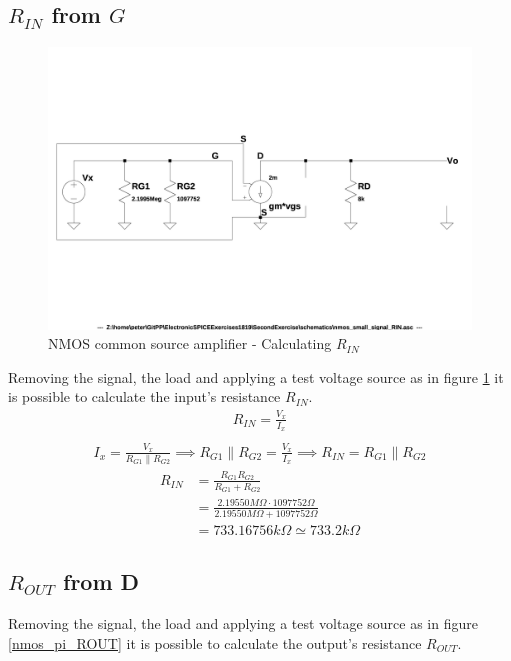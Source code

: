 \documentclass[10pt,a4paper]{book}
\begin{document}
\subsection{$R_{IN}$ from $G$}

\begin{figure}[h]
  \centering
  \includegraphics[width=12cm]{schematics/nmos_small_signal_RIN.jpg}
  \caption{NMOS common source amplifier - Calculating $R_{IN}$}
  \label{nmos_pi_RIN}
\end{figure}

Removing the signal, the load and applying a test voltage source as in figure \ref{nmos_pi_RIN} it is possible to calculate the input's resistance $R_{IN}$.\\

\begin{align}
R_{IN} = \frac{V_x}{I_x}\\
\end{align}
\begin{align}
I_x = \frac{V_x}{R_{G1} \parallel R_{G2}} \implies R_{G1} \parallel R_{G2} = \frac{V_x}{I_x}
\implies R_{IN} = R_{G1} \parallel R_{G2}
\end{align}
\begin{align}
R_{IN} &= \frac{R_{G1} R_{G2}}{R_{G1} + R_{G2}}\\
&= \frac{2.19550 M\Omega \cdot 1097752\Omega}{2.19550 M\Omega + 1097752\Omega}\\
&= 733.16756k\Omega \simeq 733.2k\Omega
\end{align}

\subsection{$R_{OUT}$ from D}

Removing the signal, the load and applying a test voltage source as in figure \ref{nmos_pi_ROUT} it is possible to calculate the output's resistance $R_{OUT}$.\\
\end{document}
